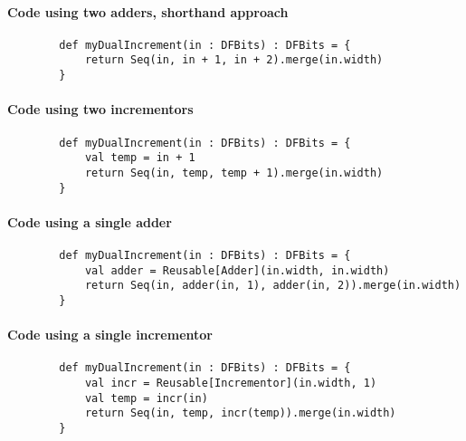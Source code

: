 {\begin{minipage}{0.65\textwidth}
	\paragraph{Code using two adders, shorthand approach}
	\begin{verbatim}
		def myDualIncrement(in : DFBits) : DFBits = {
			return Seq(in, in + 1, in + 2).merge(in.width)
		}
	\end{verbatim}
	\paragraph{Code using two incrementors}
	\begin{verbatim}
		def myDualIncrement(in : DFBits) : DFBits = {
			val temp = in + 1
			return Seq(in, temp, temp + 1).merge(in.width)
		}
	\end{verbatim}
	\paragraph{Code using a single adder}
	\begin{verbatim}
		def myDualIncrement(in : DFBits) : DFBits = {
			val adder = Reusable[Adder](in.width, in.width)
			return Seq(in, adder(in, 1), adder(in, 2)).merge(in.width)
		}
	\end{verbatim}
	\paragraph{Code using a single incrementor}
	\begin{verbatim}
		def myDualIncrement(in : DFBits) : DFBits = {
			val incr = Reusable[Incrementor](in.width, 1)
			val temp = incr(in)
			return Seq(in, temp, incr(temp)).merge(in.width)
		}
	\end{verbatim}
	
\end{minipage}}\hfill%
\vfill
\pagebreak


